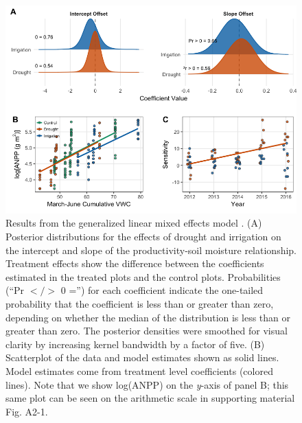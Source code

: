 \documentclass[fleqn,10pt,lineno]{wlpeerj} %
\begin{document}
\begin{figure}[!ht]
  \centering
      \includegraphics[width=5in]{../figures/glmm_main_results.png}
  \caption{Results from the generalized linear mixed effects model . (A) Posterior distributions for the effects of drought and irrigation on the intercept and slope of the productivity-soil moisture relationship. Treatment effects show the difference between the coefficients estimated in the treated plots and the control plots. Probabilities (``Pr $</>$ 0 ='') for each coefficient indicate the one-tailed probability that the coefficient is less than or greater than zero, depending on whether the median of the distribution is less than or greater than zero. The posterior densities were smoothed for visual clarity by increasing kernel bandwidth by a factor of five. (B) Scatterplot of the data and model estimates shown as solid lines. Model estimates come from treatment level coefficients (colored lines). Note that we show log(ANPP) on the \emph{y}-axis of panel B; this same plot can be seen on the arithmetic scale in supporting material Fig. A2-1. }
\end{figure}

\newpage{}
\end{document}
